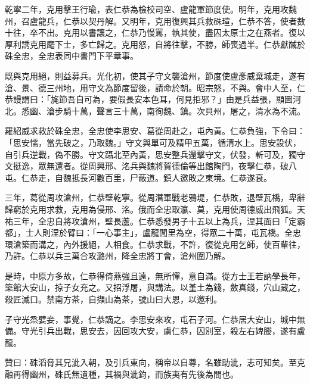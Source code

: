 \begin{pinyinscope}
 乾寧二年，克用擊王行瑜，表仁恭為檢校司空、盧龍軍節度使。明年，克用攻魏州，召盧龍兵，仁恭以契丹解。又明年，克用復興其兵救硃瑄，仁恭不答，使者數十往，卒不出。克用以書讓之，仁恭乃慢罵，執其使，盡囚太原士之在燕者。復以厚利誘克用麾下士，多亡歸之。克用怒，自將往擊，不勝，師喪過半。仁恭獻馘於硃全忠，全忠表同中書門下平章事。



 既與克用絕，則益募兵。光化初，使其子守文襲滄州，節度使盧彥威棄城走，遂有滄、景、德三州地，用守文為節度留後，請命於朝。昭宗怒，不與。會中人至，仁恭謾謂曰：「旄節吾自可為，要假長安本色耳，何見拒邪？」由是兵益張，顯圖河北。悉幽、滄步騎十萬，聲言三十萬，南徇魏、鎮。次貝州，屠之，清水為不流。



 羅紹威求救於硃全忠，全忠使李思安、葛從周赴之，屯內黃。仁恭負強，下令曰：「思安懦，當先破之，乃取魏。」守文與單可及精甲五萬，循清水上。思安設伏，自引兵逆戰，偽不勝。守文躡北至內黃，思安整兵還擊守文，伏發，斬可及，獨守文挺逸，眾無還者。從周興邢、洺兵與魏將賀德倫等出館陶門，夜擊仁恭，破八屯。仁恭走，自魏抵長河數百里，尸蔽道。鎮人邀敗之東境。仁恭遂衰。



 三年，葛從周攻滄州，仁恭壁乾寧。從周潛軍戰老鴉堤，仁恭敗，退壁瓦橋，卑辭歸窮於克用求救，克用為侵邢、洺。俄而全忠取瀛、莫，克用使周德威出飛狐。天祐三年，全忠自將攻滄州，壁長蘆。仁恭悉發男子十五以上為兵，涅其面曰「定霸都」，士人則涅於臂曰：「一心事主」，盧龍閭里為空，得眾二十萬，屯瓦橋。全忠環滄築而溝之，內外援絕，人相食。仁恭求戰，不許，復從克用乞師，使百輩往，乃許。仁恭以兵三萬合攻潞州，降全忠將丁會，滄州圍乃解。



 是時，中原方多故，仁恭得倚燕強且遠，無所憚，意自滿。從方士王若訥學長年，築館大安山，掠子女充之。又招浮屠，與講法。以堇土為錢，斂真錢，穴山藏之，殺匠滅口。禁南方茶，自擷山為茶，號山曰大恩，以邀利。



 子守光烝嬖妾，事覺，仁恭謫之。李思安來攻，屯石子河。仁恭居大安山，城中無備。守光引兵出戰，思安去，因回攻大安，虜仁恭，囚別室，殺左右婢媵，遂有盧龍。



 贊曰：硃滔脅其兄泚入朝，及引兵東向，稱帝以自尊，名雖助泚，志可知矣。至克融再得幽州，硃氏無遺種，其禍與泚鈞，而族夷有先後為間也。



\end{pinyinscope}